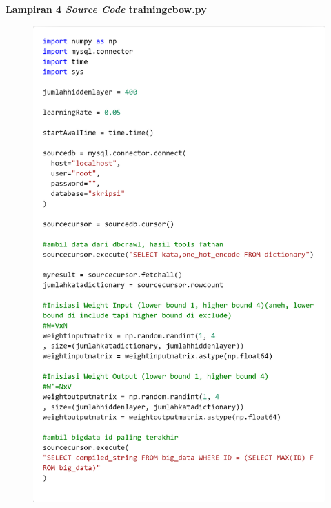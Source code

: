 \documentclass[12pt]{report}
\begin{document}
\newpage
{\parindent0pt \textbf{Lampiran 4 \textit{Source Code} trainingcbow.py}}
\begin{figure}[H]
\centering
\includegraphics[scale=0.3]{trainingcbow1}
\end{figure}
\end{document}
